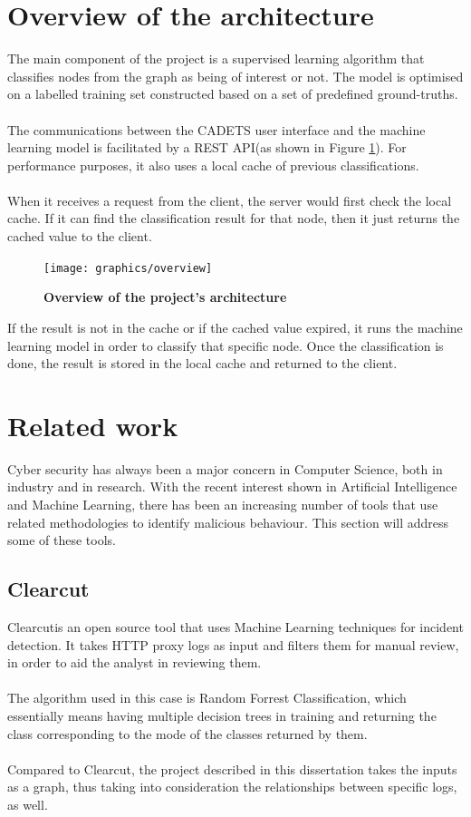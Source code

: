 	\section{Overview of the architecture}
	The main component of the project is a supervised learning algorithm that classifies nodes from the graph as being of interest or not. The model is optimised on a labelled training set constructed based on a set of predefined ground-truths.
	\\ \\
	The communications between the CADETS user interface and the machine learning model is facilitated by a REST API(as shown in Figure \ref{Figure 1.2}). For performance purposes, it also uses a local cache of previous classifications. 
	\\ \\ 
	When it receives a request from the client, the server would first check the local cache. If it can find the classification result for that node, then it just returns the cached value to the client.
	\begin{figure}[H]
		\caption{\bf Overview of the project's architecture}
		\centering
		\texttt{[image: graphics/overview]}
		\label{Figure 1.2}
	\end{figure}
	
	If the result is not in the cache or if the cached value expired, it runs the machine learning model in order to classify that specific node. Once the classification is done, the result is stored in the local cache and returned to the client. 
	
	\section{Related work}
	Cyber security has always been a major concern in Computer Science, both in industry and in research. With the recent interest shown in Artificial Intelligence and Machine Learning, there has been an increasing number of tools that use related methodologies to identify malicious behaviour. This section will address some of these tools. 
	
	\subsection{Clearcut}
	Clearcut\footnotemark[1] is an open source tool that uses Machine Learning techniques for incident detection. It takes HTTP proxy logs as input and filters them for manual review, in order to aid the analyst in reviewing them. 
	\\ \\ 
	The algorithm used in this case is Random Forrest Classification, which essentially means having multiple decision trees in training and returning the class corresponding to the mode of the classes returned by them. 
	\\ \\
	Compared to Clearcut, the project described in this dissertation takes the inputs as a graph, thus taking into consideration the relationships between specific logs, as well. 
	
